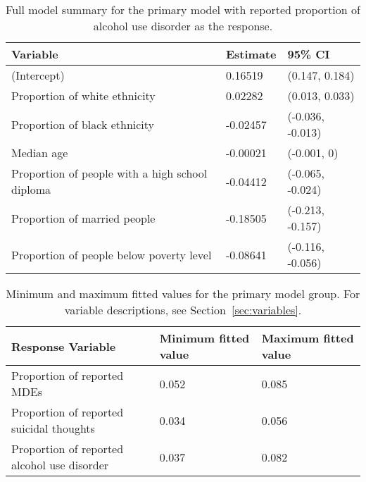 \documentclass{article}
\begin{document}
\begin{table}[t]
\begin{center}
    \begin{tabular}{lll}
        \toprule
        Variable & Estimate & 95\% CI\\
        \midrule
        (Intercept) & 0.16519 & (0.147, 0.184)\\
        Proportion of white ethnicity & 0.02282 & (0.013, 0.033)\\
        Proportion of black ethnicity & -0.02457 & (-0.036, -0.013)\\
        Median age & -0.00021 & (-0.001, 0)\\
        Proportion of people with a high school diploma & -0.04412 & (-0.065, -0.024)\\
        Proportion of married people & -0.18505 & (-0.213, -0.157)\\
        Proportion of people below poverty level & -0.08641 & (-0.116, -0.056)\\
        \bottomrule
    \end{tabular}
\end{center}
\caption{\label{tab:primary-alcohol-use-full-summary}
    Full model summary for the primary model with
    reported proportion of alcohol use disorder
    as the response.
}
\end{table}


\begin{table}[t]
\begin{center}
\begin{tabular}{l l l}
    \toprule
    Response Variable & Minimum fitted value & Maximum fitted value\\
    \midrule
    Proportion of reported MDEs & 0.052 & 0.085\\
    Proportion of reported suicidal thoughts & 0.034 & 0.056\\
    Proportion of reported alcohol use disorder & 0.037 & 0.082\\
    \bottomrule
\end{tabular}
\end{center}
\caption{\label{tab:fitted} Minimum and maximum fitted values
    for the primary model group. For variable descriptions,
    see Section~\ref{sec:variables}.
}
\end{table}

\pagebreak

\printbibliography
\end{document}

